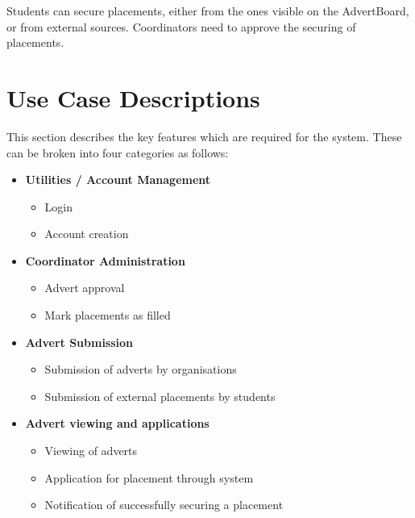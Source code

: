 \documentclass{l3deliverable}
\begin{document}
Students can secure placements, either from the ones visible on the AdvertBoard, or from external sources. Coordinators need to approve the securing of placements.


\newpage
\section{Use Case Descriptions}
This section describes the key features which are required for the system. These can be broken into four categories as follows:\
\begin{itemize}
\item{\textbf{Utilities / Account Management}
	\begin{itemize}
		\item{Login}
		\item{Account creation}
	\end{itemize}}
\item{\textbf{Coordinator Administration}
	\begin{itemize}
		\item{Advert approval}
		\item{Mark placements as filled}
	\end{itemize}}
\item{\textbf{Advert Submission}
	\begin{itemize}
		\item{Submission of adverts by organisations}
		\item{Submission of external placements by students}
	\end{itemize}}
\item{\textbf{Advert viewing and applications}
	\begin{itemize}
		\item{Viewing of adverts}
		\item{Application for placement through system}
		\item{Notification of successfully securing a placement}
	\end{itemize}}
\end{itemize}



\newpage
\end{document}
